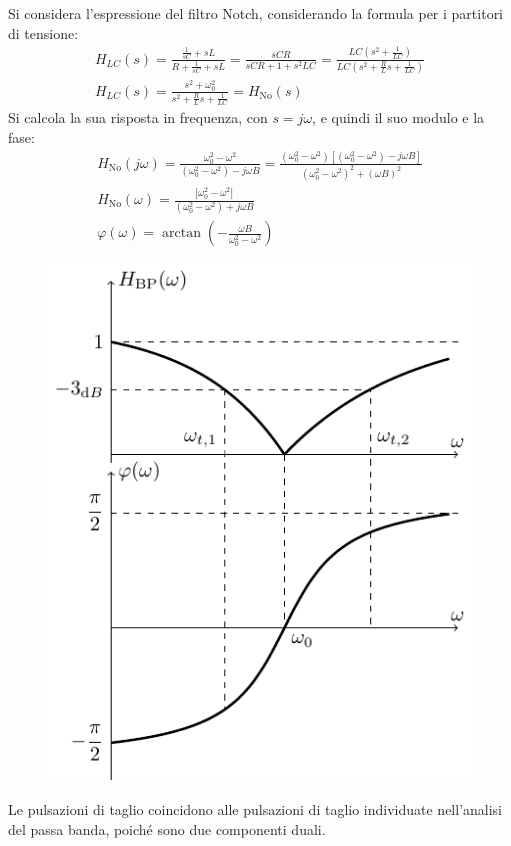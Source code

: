 \documentclass{article}
\numberwithin{equation}{subsection}
\begin{document}
Si considera l'espressione del filtro Notch, considerando la formula per i partitori di tensione:
\begin{gather*}
    H_{LC}(s)=\frac{\displaystyle\frac{1}{sC}+sL}{R+\displaystyle\frac{1}{sC}+sL}=\frac{sCR}{sCR+1+s^2LC}=\frac{LC\left(s^2+\displaystyle\frac{1}{LC}\right)}{LC\left(\displaystyle s^2+\frac{R}{L}s+\frac{1}{LC}\right)}\\
    H_{LC}(s)=\displaystyle\frac{s^2+\omega_0^2}{\displaystyle s^2+\frac{R}{L}s+\frac{1}{LC}}=H_{\mathrm{\mathrm{No}}}(s)
\end{gather*}
Si calcola la sua risposta in frequenza, con $s=j\omega$, e quindi il suo modulo e la fase:
\begin{gather}
    H_{\mathrm{\mathrm{No}}}(j\omega)=\displaystyle\frac{\omega_0^2-\omega^2}{(\omega_0^2-\omega^2)-j\omega B}=\frac{(\omega_0^2-\omega^2)\left[(\omega_0^2-\omega^2)-j\omega B\right]}{(\omega_0^2-\omega^2)^2+(\omega B)^2}\\
    H_\mathrm{\mathrm{No}}(\omega)=\displaystyle\frac{|\omega_0^2-\omega^2|}{(\omega_0^2-\omega^2)+j\omega B}\\
    \varphi(\omega)=\arctan\left(-\displaystyle\frac{ \omega B}{ \omega_0^2-\omega^2}\right)
\end{gather}
\begin{figure}[H]%
    \centering
    \includegraphics{reiezione-banda}%
\end{figure}
Le pulsazioni di taglio coincidono alle pulsazioni di taglio individuate nell'analisi del passa banda, poiché sono due componenti duali. 
\end{document}
